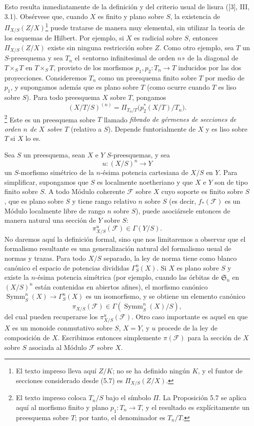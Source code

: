 Esto resulta inmediatamente de la definición y del criterio usual de lisura
([3], III, 3.1). Obsérvese que, cuando $X$ es finito y plano sobre $S$, la
existencia de $\Pi_{X/S}(Z/X)$\footnote{El texto impreso lleva aquí $Z/K$; no
se ha definido ningún $K$, y el funtor de secciones considerado desde (5.7) es
$\Pi_{X/S}(Z/X)$.} puede tratarse de manera muy elemental, sin
utilizar la teoría de los esquemas de Hilbert. Por ejemplo, si $X$ es radicial
sobre $S$, entonces $\Pi_{X/S}(Z/X)$ existe sin ninguna restricción sobre $Z$.
Como otro ejemplo, sea $T$ un $S$-preesquema y sea $T_n$ el «entorno
infinitesimal de orden $n$» de la diagonal de $T\times_ST$ en $T\times_ST$,
provisto de los morfismos $p_1,p_2:T_n\longrightarrow T$ inducidos por las dos
proyecciones. Consideremos $T_n$ como un preesquema finito sobre $T$ por medio
de $p_1$, y supongamos además que es plano sobre $T$ (como ocurre cuando $T$
es liso sobre $S$). Para todo preesquema $X$ sobre $T$, pongamos
\[
(X/T/S)^{(n)}=
\Pi_{T_n/T}\bigl(p_2^*(X/T)/T_n\bigr).
\]
\footnote{El texto impreso coloca $T_n/S$ bajo el símbolo $\Pi$. La
Proposición 5.7 se aplica aquí al morfismo finito y plano
$p_1:T_n\to T$, y el resultado es explícitamente un preesquema sobre $T$; por
tanto, el denominador es $T_n/T$.}
Este es un preesquema sobre $T$ llamado \emph{fibrado de gérmenes de secciones
de orden $n$ de $X$ sobre $T$} (relativo a $S$). Depende funtorialmente de $X$
y es liso sobre $T$ si $X$ lo es.


Sea $S$ un preesquema, sean $X$ e $Y$ $S$-preesquemas, y sea
\[
u:(X/S)^n\longrightarrow Y
\]
un $S$-morfismo simétrico de la $n$-ésima potencia cartesiana de $X/S$ en
$Y$. Para simplificar, supongamos que $S$ es localmente noetheriano y que $X$
e $Y$ son de tipo finito sobre $S$. A todo Módulo coherente $\mathcal F$ sobre
$X$ cuyo soporte es finito sobre $S$, que es plano sobre $S$ y tiene rango
relativo $n$ sobre $S$ (es decir, $f_*(\mathcal F)$ es un Módulo localmente
libre de rango $n$ sobre $S$), puede asociársele entonces de manera natural una
sección de $Y$ sobre $S$:
\[
\pi^u_{X/S}(\mathcal F)\in\Gamma(Y/S).
\]
No daremos aquí la definición formal, sino que nos limitaremos a observar que
el formalismo resultante es una generalización natural del formalismo usual de
normas y trazas. Para todo $X/S$ separado, la ley de norma tiene como blanco canónico el espacio de potencias divididas $\Gamma^n_S(X)$. Si $X$ es plano sobre $S$ y existe la $n$-ésima potencia simétrica (por ejemplo, cuando las órbitas de $\mathfrak S_n$ en $(X/S)^n$ están contenidas en abiertos afines), el morfismo canónico $\operatorname{Symm}^n_S(X)\to\Gamma^n_S(X)$ es un isomorfismo, y se obtiene un elemento canónico
\[
\pi_{X/S}(\mathcal F)\in\Gamma(\operatorname{Symm}^n_S(X)/S),
\]
del cual pueden recuperarse los $\pi^u_{X/S}(\mathcal F)$. Otro caso
importante es aquel en que $X$ es un monoide conmutativo sobre $S$, $X=Y$, y
$u$ procede de la ley de composición de $X$. Escribimos entonces simplemente
$\pi(\mathcal F)$ para la sección de $X$ sobre $S$ asociada al Módulo
$\mathcal F$ sobre $X$.

